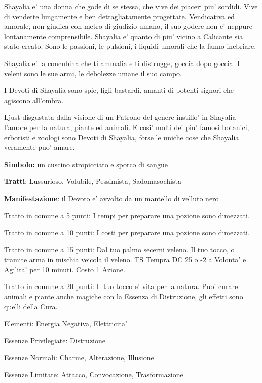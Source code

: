 \documentclass[a4paper,11pt,twoside,openany]{book}
\begin{document}
{		Shayalia e' una donna che gode di se stessa, che vive dei piaceri piu' sordidi. Vive di vendette lungamente e ben dettagliatamente progettate. Vendicativa ed amorale, non giudica con metro di giudizio umano, il suo godere non e' neppure lontanamente comprensibile. Shayalia e' quanto di piu' vicino a Calicante sia stato creato. Sono le passioni, le pulsioni, i liquidi umorali che la fanno inebriare.
		
		Shayalia e' la concubina che ti ammalia e ti distrugge, goccia dopo goccia. I veleni sono le sue armi, le debolezze umane il suo campo.
		
		I Devoti di Shayalia sono spie, figli bastardi, amanti di potenti signori che agiscono all'ombra.
		
		Ljust disgustata dalla visione di un Patrono del genere instillo' in Shayalia l'amore per la natura, piante ed animali. E cosi' molti dei piu' famosi botanici, erboristi e zoologi sono Devoti di Shayalia, forse le uniche cose che Shayalia veramente puo' amare.
		
		\textbf{Simbolo:} un cuscino stropicciato e sporco di sangue
		
		\textbf{Tratti}: Lussurioso, Volubile, Pessimista, Sadomasochista
		
		\textbf{Manifestazione}: il Devoto e' avvolto da un mantello di velluto nero
		
		\bigskip
		
		Tratto in comune a 5 punti: I tempi per preparare una pozione sono dimezzati.
		
		Tratto in comune a 10 punti: I costi per preparare una pozione sono dimezzati.
		
		Tratto in comune a 15 punti: Dal tuo palmo secerni veleno. Il tuo tocco, o tramite arma in mischia veicola il veleno. TS Tempra DC 25 o -2 a Volonta' e Agilita' per 10 minuti. Costo 1 Azione.
		
		Tratto in comune a 20 punti: Il tuo tocco e' vita per la natura. Puoi curare animali e piante anche magiche con la Essenza di Distruzione, gli effetti sono quelli della Cura.
		
		\bigskip
		
		Elementi: Energia Negativa, Elettricita'
		
		\bigskip
		
		Essenze Privilegiate: Distruzione
		
		Essenze Normali: Charme, Alterazione, Illusione
		
		Essenze Limitate: Attacco, Convocazione, Trasformazione
		
}
\end{document}
